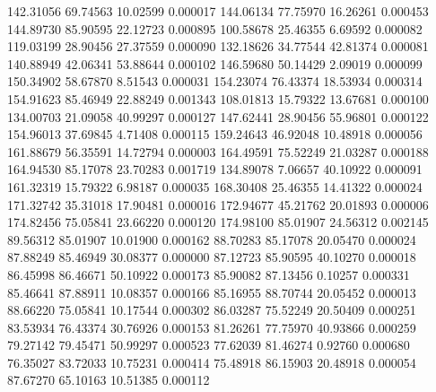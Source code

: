       142.31056       69.74563       10.02599       0.000017
      144.06134       77.75970       16.26261       0.000453
      144.89730       85.90595       22.12723       0.000895
      100.58678       25.46355        6.69592       0.000082
      119.03199       28.90456       27.37559       0.000090
      132.18626       34.77544       42.81374       0.000081
      140.88949       42.06341       53.88644       0.000102
      146.59680       50.14429        2.09019       0.000099
      150.34902       58.67870        8.51543       0.000031
      154.23074       76.43374       18.53934       0.000314
      154.91623       85.46949       22.88249       0.001343
      108.01813       15.79322       13.67681       0.000100
      134.00703       21.09058       40.99297       0.000127
      147.62441       28.90456       55.96801       0.000122
      154.96013       37.69845        4.71408       0.000115
      159.24643       46.92048       10.48918       0.000056
      161.88679       56.35591       14.72794       0.000003
      164.49591       75.52249       21.03287       0.000188
      164.94530       85.17078       23.70283       0.001719
      134.89078        7.06657       40.10922       0.000091
      161.32319       15.79322        6.98187       0.000035
      168.30408       25.46355       14.41322       0.000024
      171.32742       35.31018       17.90481       0.000016
      172.94677       45.21762       20.01893       0.000006
      174.82456       75.05841       23.66220       0.000120
      174.98100       85.01907       24.56312       0.002145
       89.56312       85.01907       10.01900       0.000162
       88.70283       85.17078       20.05470       0.000024
       87.88249       85.46949       30.08377       0.000000
       87.12723       85.90595       40.10270       0.000018
       86.45998       86.46671       50.10922       0.000173
       85.90082       87.13456        0.10257       0.000331
       85.46641       87.88911       10.08357       0.000166
       85.16955       88.70744       20.05452       0.000013
       88.66220       75.05841       10.17544       0.000302
       86.03287       75.52249       20.50409       0.000251
       83.53934       76.43374       30.76926       0.000153
       81.26261       77.75970       40.93866       0.000259
       79.27142       79.45471       50.99297       0.000523
       77.62039       81.46274        0.92760       0.000680
       76.35027       83.72033       10.75231       0.000414
       75.48918       86.15903       20.48918       0.000054
       87.67270       65.10163       10.51385       0.000112
